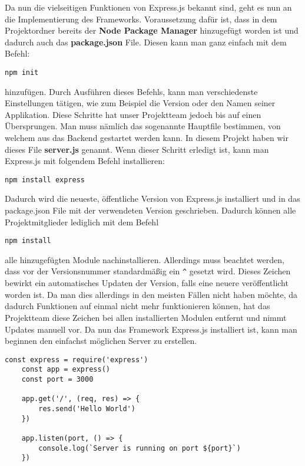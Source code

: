 Da nun die vielseitigen Funktionen von Express.js bekannt sind, geht es nun an die Implementierung des Frameworks. Voraussetzung dafür ist, dass in dem Projektordner bereits der \textbf{Node Package Manager} hinzugefügt worden ist und dadurch auch das \textbf{package.json} File. Diesen kann man ganz einfach mit dem Befehl:
\begin{verbatim}
npm init
\end{verbatim}
hinzufügen. Durch Ausführen dieses Befehls, kann man verschiedenste Einstellungen tätigen, wie zum Beispiel die Version oder den Namen seiner Applikation. Diese Schritte hat unser Projektteam jedoch bis auf einen Übersprungen. Man muss nämlich das sogenannte Hauptfile bestimmen, von welchem aus das Backend gestartet werden kann. In diesem Projekt haben wir dieses File \textbf{server.js} genannt. Wenn dieser Schritt erledigt ist, kann man Express.js mit folgendem Befehl installieren:
\begin{verbatim}
npm install express
\end{verbatim}
Dadurch wird die neueste, öffentliche Version von Express.js installiert und in das package.json File mit der verwendeten Version geschrieben. Dadurch können alle Projektmitglieder lediglich mit dem Befehl
\begin{verbatim}
npm install
\end{verbatim}
alle hinzugefügten Module nachinstallieren. Allerdings muss beachtet werden, dass vor der Versionsnummer standardmäßig ein \verb|^| gesetzt wird. Dieses Zeichen bewirkt ein automatisches Updaten der Version, falls eine neuere veröffentlicht worden ist. Da man dies allerdings in den meisten Fällen nicht haben möchte, da dadurch Funktionen auf einmal nicht mehr funktionieren können, hat das Projektteam diese Zeichen bei allen installierten Modulen entfernt und nimmt Updates manuell vor.
\newline
\cite{installing_express_js}
\newline
Da nun das Framework Express.js installiert ist, kann man beginnen den einfachst möglichen Server zu erstellen.
\begin{lstlisting}[caption=Einfachst möglicher express.js Server]
    const express = require('express')
    const app = express()
    const port = 3000

    app.get('/', (req, res) => {
        res.send('Hello World')
    })

    app.listen(port, () => {
        console.log(`Server is running on port ${port}`)
    })
\end{lstlisting}

